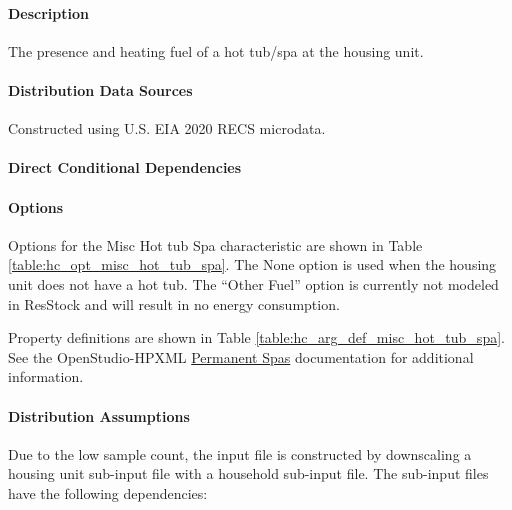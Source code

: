 \paragraph{Description}
% 
The presence and heating fuel of a hot tub/spa at the housing unit.

\paragraph{Distribution Data Sources}
% 
Constructed using U.S. EIA 2020 RECS microdata. 

\paragraph{Direct Conditional Dependencies}


\paragraph{Options}
Options for the Misc Hot tub Spa characteristic are shown in Table \ref{table:hc_opt_misc_hot_tub_spa}. The None option is used when the housing unit does not have a hot tub. The “Other Fuel” option is currently not modeled in ResStock and will result in no energy consumption.



Property definitions are shown in Table \ref{table:hc_arg_def_misc_hot_tub_spa}. See the OpenStudio-HPXML \href{https://openstudio-hpxml.readthedocs.io/en/v1.10.0/workflow_inputs.html#hpxml-permanent-spas}{Permanent Spas} documentation for additional information.



\paragraph{Distribution Assumptions}
% 
Due to the low sample count, the input file is constructed by downscaling a housing unit sub-input file with a household sub-input file. The sub-input files have the following dependencies: 

